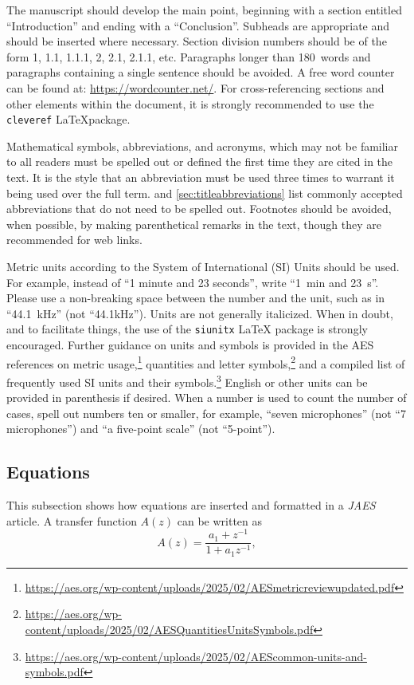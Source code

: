\documentclass[fleqn]{jaes}
\begin{document}
The manuscript should develop the main point, beginning with a section entitled ``Introduction'' and ending with a ``Conclusion''. Subheads are appropriate and should be inserted where necessary. Section division numbers should be of the form 1, 1.1, 1.1.1, 2, 2.1, 2.1.1, etc. Paragraphs longer than 180~words and paragraphs containing a single sentence should be avoided. A free word counter can be found at: \url{https://wordcounter.net/}. For cross-referencing sections and other elements within the document, it is strongly recommended to use the \texttt{cleveref} \LaTeX package.

Mathematical symbols, abbreviations, and acronyms, which may not be familiar to all readers must be spelled out or defined the first time they are cited in the text. It is the style that an abbreviation must be used three times to warrant it being used over the full term. 
 and \cref{sec:titleabbreviations} list commonly accepted abbreviations that do not need to be spelled out. 
Footnotes should be avoided, when possible, by making parenthetical remarks in the text, though they are recommended for web links. 

Metric units according to the System of International (SI) Units should be used. For example, instead of ``1 minute and 23 seconds'', write ``\SI{1}{\minute} and \SI{23}{\second}''. Please use a non-breaking space between the number and the unit, such as in ``44.1~kHz'' (not ``44.1kHz''). Units are not generally
italicized. When in doubt, and to facilitate things, the use of the
\texttt{siunitx} \LaTeX{} package is strongly encouraged. Further guidance on units and symbols is provided in the AES references on metric usage,\footnote{\url{https://aes.org/wp-content/uploads/2025/02/AESmetricreviewupdated.pdf}}
quantities and letter symbols,\footnote{\url{https://aes.org/wp-content/uploads/2025/02/AESQuantitiesUnitsSymbols.pdf}}
and a compiled list of frequently used SI units and their
symbols.\footnote{\url{https://aes.org/wp-content/uploads/2025/02/AEScommon-units-and-symbols.pdf}}
English or other units can be provided in parenthesis if desired. When a number is used to count the number of cases, spell out numbers ten or smaller, for example, ``seven microphones'' (not ``7 microphones'') and ``a five-point scale'' (not ``5-point'').

\subsection{Equations}
This subsection shows how equations are inserted and formatted in a \emph{JAES} article. A transfer function $A(z)$ can be written as
\begin{equation}
A(z) = \frac{{a_1  + z^{ - 1} }}{{1 + a_1 z^{ - 1} }},
\label{eq:transfer_function}
\end{equation}
\end{document}
